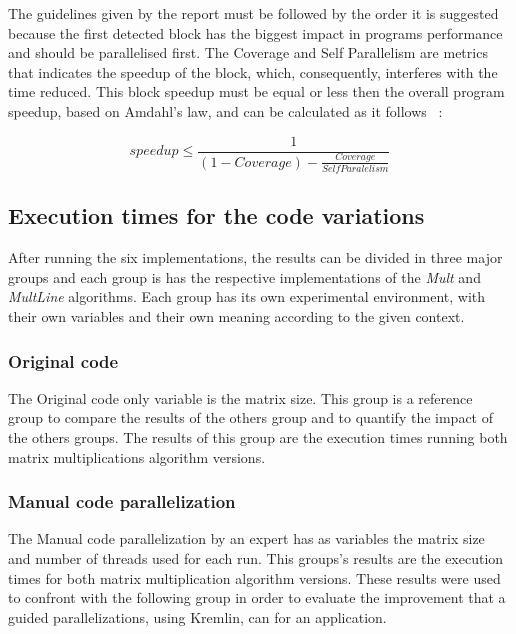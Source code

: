 The guidelines given by the report must be followed by the order it is suggested because the first detected block has the biggest impact in programs performance and should be parallelised first. The Coverage and Self Parallelism are metrics that indicates the speedup of the block, which, consequently, interferes with the time reduced. This block speedup must be equal or less then the overall program speedup, based on Amdahl's law, and can be calculated as it follows ~\cite{Saturnino}:

\begin{equation}
speedup \leq \frac{1}{(1- Coverage) - \frac{Coverage}{Self Paralelism}}
\end{equation}

\subsection{Execution times for the code variations}

After running the six implementations, the results can be divided in three major groups and each group is has the respective implementations of the \textit{Mult} and \textit{MultLine} algorithms. Each group has its own experimental environment,  with their own variables and their own meaning according to the given context.

\subsubsection{Original code}

The Original code only variable is the matrix size. This group is  a reference group to compare the results of the others group and to quantify the impact of the others groups. The results of this group are the execution times running both matrix multiplications algorithm versions.

\subsubsection{Manual code parallelization}

The Manual code parallelization by an expert has as variables the matrix size and number of threads used for each run. This groups's results are the execution times for both matrix multiplication algorithm versions. These results were used to confront with the following group in order to evaluate the improvement that a guided parallelizations, using Kremlin, can for an application.

